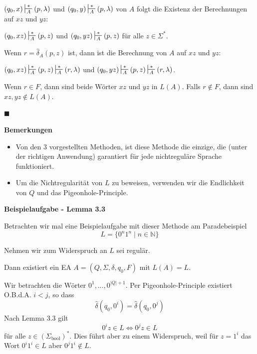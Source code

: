 \documentclass[a4paper, 11pt]{article}
\def\N{\mathbb{N}}
\newcommand\myTitle[1]{{\large \textbf {#1}}}
\begin{document}
    $(q_0, x) \sststile{A}{*} (p, \lambda)$ und $(q_0, y) \sststile{A}{*} (p, \lambda)$
    von $A$ folgt die Existenz der Berechnungen auf $xz$ und $yz$:

    $(q_0, xz) \sststile{A}{*} (p, z)$ und $(q_0, yz) \sststile{A}{*} (p, z)$ für alle $z \in \Sigma^*$.

    Wenn $r = \hat{\delta}_A(p, z)$ ist, dann ist die Berechnung von $A$ auf $xz$ und $yz$:

    $(q_0, xz) \sststile{A}{*} (p, z) \sststile{A}{*} (r, \lambda)$ und $(q_0, yz) \sststile{A}{*} (p, z) \sststile{A}{*} (r, \lambda)$.

    Wenn $r \in F$, dann sind beide Wörter $xz$ und $yz$ in $L(A)$. Falls $r \notin F$, dann sind $xz, yz \notin L(A)$.

    \hspace*{0pt}\hfill$\blacksquare$

    \myTitle{Bemerkungen}\\
    \begin{itemize}[label=-]
        \item Von den 3 vorgestellten Methoden, ist diese Methode die einzige, die (unter der richtigen Anwendung) garantiert für jede nichtreguläre Sprache funktioniert.
        \item Um die Nichtregularität von $L$ zu beweisen, verwenden wir die Endlichkeit von $Q$ und das Pigeonhole-Principle.
    \end{itemize}

    \myTitle{Beispielaufgabe - Lemma 3.3}

    Betrachten wir mal eine Beispielaufgabe mit dieser Methode am Paradebeispiel $$L = \{0^n1^n \mid n \in \N\}$$

    Nehmen wir zum Widerspruch an $L$ sei regulär.

    Dann existiert ein EA $A = (Q, \Sigma, \delta, q_0, F)$ mit $L(A) = L$.

    Wir betrachten die Wörter $0^1, \dots, 0^{|Q|+1}$. Per Pigeonhole-Principle existiert O.B.d.A. $i < j$, so dass 
    $$\hat{\delta}(q_0, 0^i) = \hat{\delta}(q_0, 0^{j})$$ 
    Nach Lemma 3.3 gilt
    $$0^iz \in L \iff 0^jz \in L$$
    für alle $z \in (\Sigma_{\text{bool}})^*$. Dies führt aber zu einem Widerspruch, weil für $z = 1^i$ das Wort $0^i1^i \in L$ aber $0^j1^i \notin L$.
\end{document}
